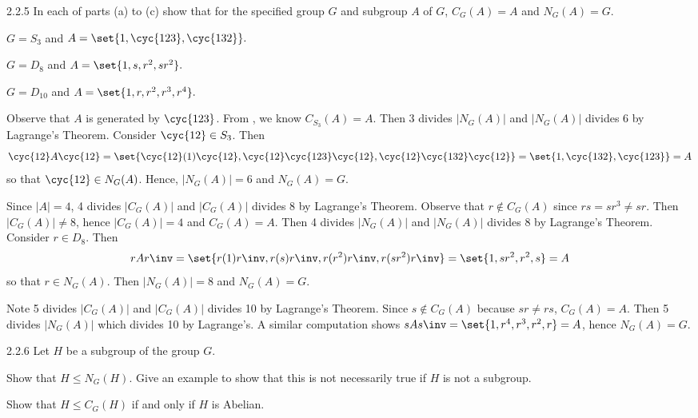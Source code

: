\begin{exercise}{2.2.5}
    In each of parts (a) to (c) show that for the specified group $G$ and subgroup $A$ of $G$, $C_G(A)=A$ and $N_G(A)=G.$
    \begin{subexercises}
        \item $G=S_3$ and $A=\set{1,\cyc{1 2 3},\cyc{1 3 2}}.$
        \item $G=D_8$ and $A=\set{1, s, r^2, sr^2}.$
        \item $G=D_{10}$ and $A=\set{1,r,r^2,r^3,r^4}.$
    \end{subexercises}
\end{exercise}

\begin{solenum}
    \item Observe that $A$ is generated by $\cyc{1 2 3}$.
	From , we know $C_{S_3}(A) = A$.
	Then 3 divides $|N_G(A)|$ and $|N_G(A)|$ divides 6 by Lagrange's Theorem.
	Consider $\cyc{1 2} \in S_3$.
	Then
    \[
    	\cyc{1 2}A\cyc{1 2} = \set{\cyc{1 2}(1)\cyc{1 2}, \cyc{1 2}\cyc{1 2 3}\cyc{1 2}, \cyc{1 2}\cyc{1 3 2}\cyc{1 2}} = \set{1, \cyc{1 3 2}, \cyc{1 2 3}} = A
    \]
    so that $\cyc{1 2} \in N_G(A)$.
	Hence, $|N_G(A)| = 6$ and $N_G(A) = G$.
    \item Since $|A| = 4$, 4 divides $|C_G(A)|$ and $|C_G(A)|$ divides 8 by Lagrange's Theorem.
	Observe that $r \notin C_G(A)$ since $rs = sr^3 \neq sr$.
	Then $|C_G(A)| \neq 8$, hence $|C_G(A)| = 4$ and $C_G(A) = A$.
	Then 4 divides $|N_G(A)|$ and $|N_G(A)|$ divides 8 by Lagrange's Theorem.
	Consider $r \in D_8$.
	Then
    \[
    	rA r\inv = \set{r(1)r\inv, r(s)r\inv, r(r^2)r\inv, r(sr^2)r\inv} = \set{1, sr^2, r^2, s} = A
    \]
    so that $r \in N_G(A)$.
	Then $|N_G(A)| = 8$ and $N_G(A) = G$.
    \item Note 5 divides $|C_G(A)|$ and $|C_G(A)|$ divides 10 by Lagrange's Theorem.
	Since $s \notin C_G(A)$ because $sr \neq rs$, $C_G(A) = A$.
	Then 5 divides $|N_G(A)|$ which divides 10 by Lagrange's.
	A similar computation shows $sAs\inv = \set{1, r^4, r^3, r^2, r} = A$, hence $N_G(A) = G$.
\end{solenum}

\begin{exercise}{2.2.6}
    Let $H$ be a subgroup of the group $G.$
    \begin{subexercises}
        \item Show that $H\le N_G(H).$ Give an example to show that this is not necessarily true if $H$ is not a subgroup.
        \item Show that $H\le C_G(H)$ if and only if $H$ is Abelian.
    \end{subexercises}
\end{exercise}

